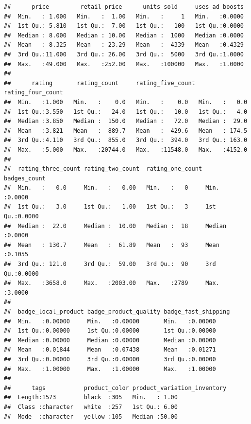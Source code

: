 \documentclass[
]{article}
\begin{document}
\begin{verbatim}
##      price         retail_price      units_sold     uses_ad_boosts  
##  Min.   : 1.000   Min.   :  1.00   Min.   :     1   Min.   :0.0000  
##  1st Qu.: 5.810   1st Qu.:  7.00   1st Qu.:   100   1st Qu.:0.0000  
##  Median : 8.000   Median : 10.00   Median :  1000   Median :0.0000  
##  Mean   : 8.325   Mean   : 23.29   Mean   :  4339   Mean   :0.4329  
##  3rd Qu.:11.000   3rd Qu.: 26.00   3rd Qu.:  5000   3rd Qu.:1.0000  
##  Max.   :49.000   Max.   :252.00   Max.   :100000   Max.   :1.0000  
##                                                                     
##      rating       rating_count     rating_five_count rating_four_count
##  Min.   :1.000   Min.   :    0.0   Min.   :    0.0   Min.   :   0.0   
##  1st Qu.:3.550   1st Qu.:   24.0   1st Qu.:   10.0   1st Qu.:   4.0   
##  Median :3.850   Median :  150.0   Median :   72.0   Median :  29.0   
##  Mean   :3.821   Mean   :  889.7   Mean   :  429.6   Mean   : 174.5   
##  3rd Qu.:4.110   3rd Qu.:  855.0   3rd Qu.:  394.0   3rd Qu.: 163.0   
##  Max.   :5.000   Max.   :20744.0   Max.   :11548.0   Max.   :4152.0   
##                                                                       
##  rating_three_count rating_two_count  rating_one_count  badges_count   
##  Min.   :   0.0     Min.   :   0.00   Min.   :   0     Min.   :0.0000  
##  1st Qu.:   3.0     1st Qu.:   1.00   1st Qu.:   3     1st Qu.:0.0000  
##  Median :  22.0     Median :  10.00   Median :  18     Median :0.0000  
##  Mean   : 130.7     Mean   :  61.89   Mean   :  93     Mean   :0.1055  
##  3rd Qu.: 121.0     3rd Qu.:  59.00   3rd Qu.:  90     3rd Qu.:0.0000  
##  Max.   :3658.0     Max.   :2003.00   Max.   :2789     Max.   :3.0000  
##                                                                        
##  badge_local_product badge_product_quality badge_fast_shipping
##  Min.   :0.00000     Min.   :0.00000       Min.   :0.00000    
##  1st Qu.:0.00000     1st Qu.:0.00000       1st Qu.:0.00000    
##  Median :0.00000     Median :0.00000       Median :0.00000    
##  Mean   :0.01844     Mean   :0.07438       Mean   :0.01271    
##  3rd Qu.:0.00000     3rd Qu.:0.00000       3rd Qu.:0.00000    
##  Max.   :1.00000     Max.   :1.00000       Max.   :1.00000    
##                                                               
##      tags           product_color product_variation_inventory
##  Length:1573        black  :305   Min.   : 1.00              
##  Class :character   white  :257   1st Qu.: 6.00              
##  Mode  :character   yellow :105   Median :50.00              

\end{verbatim}
\end{document}
